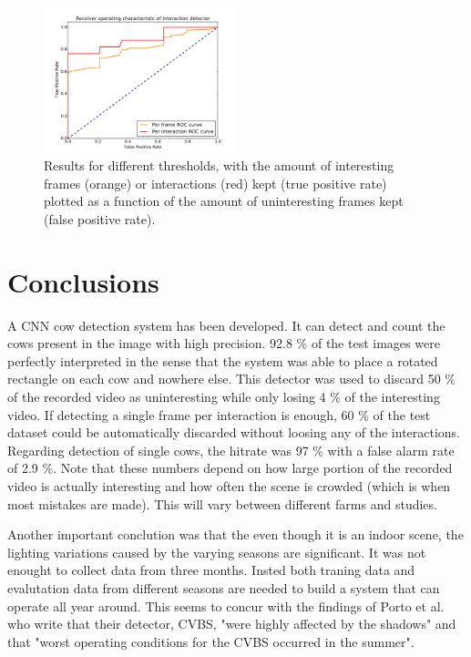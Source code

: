 \documentclass{cta-author}
\begin{document}
\begin{figure}[tb]
\begin{center}
  \includegraphics[width=0.5\textwidth]{roc.pdf}
\end{center}
  \caption{Results for different thresholds, with the amount of interesting frames (orange) or interactions 
(red) kept (true positive rate) plotted as a function of the amount of uninteresting frames kept (false 
positive rate).}
  \label{fig:roc}
\end{figure}


\section{Conclusions}
A CNN cow detection system has been developed. It can detect and count the cows present in the image with 
high precision. 92.8 \% of the test images were perfectly interpreted in the sense that the system was able 
to place a rotated rectangle on each cow and nowhere else. This detector was used to discard 50 \% of the 
recorded video as uninteresting while only losing 4 \% of the interesting video. If detecting a single frame 
per interaction is enough, 60 \% of the test dataset could be automatically discarded without loosing any of the 
interactions. Regarding detection of single cows, the hitrate was 97 \% with a false alarm rate of 2.9 \%. 
Note that these numbers depend on how large portion of the recorded video is actually interesting and how 
often the scene is crowded (which is when most mistakes are made). This will vary between different farms and 
studies.

Another important conclution was that the even though it is an indoor scene, the lighting variations caused 
by the varying seasons are significant. It was not enought to collect data from three months. Insted both 
traning data and evalutation data from different seasons are needed to build a system that can operate all 
year around. This seems to concur with the findings of Porto et al. \cite{porto2015automatic} who write that 
their detector, CVBS, 
"were highly affected by the shadows" and that "worst operating
conditions for the CVBS occurred in the summer".
\end{document}
